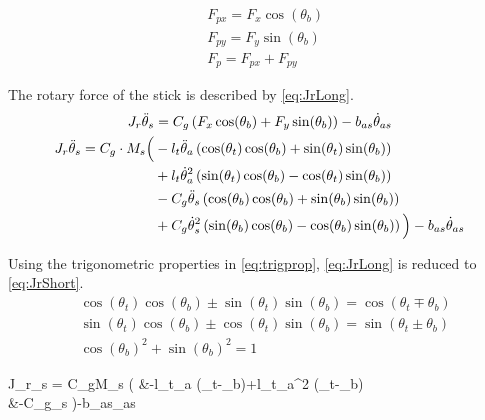 		
		\begin{subequations}\label{eq:perpFxFy}
			\begin{flalign}
				& F_{px}=F_x\cos(\theta_b) \\
				& F_{py}=F_y\sin(\theta_b)  \\
				& F_p = F_{px}+F_{py} 
			\end{flalign}
		\end{subequations}
		
		The rotary force of the stick is described by \autoref{eq:JrLong}.
		\begin{subequations}
			\begin{flalign}
				J_r\ddot{\theta}_s &=C_g\left(F_x\cos(\theta_b)+F_y\sin(\theta_b)\right)-b_{as}\dot{\theta}_{as}  \\
				J_r\ddot{\theta}_s = C_g \cdot M_s \Big( &-l_t\ddot{\theta}_a\left(\cos(\theta_t)\cos(\theta_b)+\sin(\theta_t)\sin(\theta_b)\right) \notag \\
				& +l_t\dot{\theta}_a^2\left(\sin(\theta_t)\cos(\theta_b)-\cos(\theta_t)\sin(\theta_b)\right) \notag \\
				& -C_g\ddot{\theta}_s\left(\cos(\theta_b)\cos(\theta_b)+\sin(\theta_b)\sin(\theta_b)\right) \notag \\
				& +C_g\dot{\theta}_s^2\left(\sin(\theta_b)\cos(\theta_b)-\cos(\theta_b)\sin(\theta_b)\right)  \notag \Big)-b_{as}\dot{\theta}_{as} \label{eq:JrLong}
			\end{flalign}
		\end{subequations}
		
		Using the trigonometric properties in \autoref{eq:trigprop}, \autoref{eq:JrLong} is reduced to \autoref{eq:JrShort}.
		\begin{subequations} \label{eq:trigprop}
			\begin{flalign}
				& \cos(\theta_t)\cos(\theta_b)\pm \sin(\theta_t)\sin(\theta_b)=\cos(\theta_t \mp \theta_b)  \\
				& \sin(\theta_t)\cos(\theta_b)\pm \cos(\theta_t)\sin(\theta_b) = \sin(\theta_t \pm \theta_b) \\ 
				& \cos(\theta_b)^2+\sin(\theta_b)^2=1 
			\end{flalign}
		\end{subequations}
		\begin{flalign}
			J_r\ddot{\theta}_s = C_gM_s \Big( &-l_t\ddot{\theta}_a \cos(\theta_t-\theta_b)+l_t\dot{\theta}_a^2 \sin(\theta_t-\theta_b) \notag \\
			&-C_g\ddot{\theta}_s \Big)-b_{as}\dot{\theta}_{as} \label{eq:JrShort}
		\end{flalign}
		
